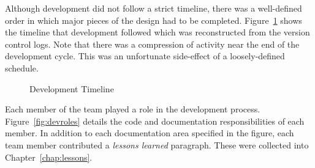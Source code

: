 Although \sys{} development did not follow a strict timeline, there was a well-defined order
in which major pieces of the design had to be completed.
Figure~\ref{fig:timeline} shows the timeline that \sys{} development followed which was
reconstructed from the version control logs. Note that there was a compression of activity
near the end of the development cycle. This was an unfortunate side-effect of a loosely-defined
schedule.
\begin{figure}[h!]
\begin{center}
  \caption{\sys{} Development Timeline}
  \label{fig:timeline}
\end{center}
\end{figure}

Each member of the \sys{} team played a role in the development process. Figure~\ref{fig:devroles}
details the code and documentation responsibilities of each member. In addition to each documentation
area specified in the figure, each team member contributed a \emph{lessons learned} paragraph. These
were collected into Chapter~\ref{chap:lessons}.

